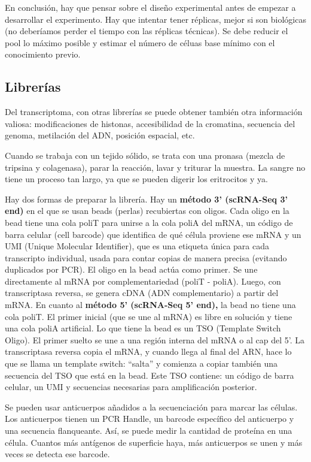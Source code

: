 En conclusión, hay que pensar sobre el diseño experimental antes de empezar a desarrollar el experimento. Hay que intentar tener réplicas, mejor si son biológicas (no deberíamos perder el tiempo con las réplicas técnicas). Se debe reducir el pool lo máximo posible y estimar el número de céluas base mínimo con el conocimiento previo.

\subsection{Librerías}
Del transcriptoma, con otras librerías se puede obtener también otra información valiosa: modificaciones de histonas, accesibilidad de la cromatina, secuencia del genoma, metilación del ADN, posición espacial, etc.

Cuando se trabaja con un tejido sólido, se trata con una pronasa (mezcla de tripsina y colagenasa), parar la reacción, lavar y triturar la muestra. La sangre no tiene un proceso tan largo, ya que se pueden digerir los eritrocitos y ya. 

Hay dos formas de preparar la librería. Hay un \textbf{método 3’ (scRNA-Seq 3’ end)} en el que se usan beads (perlas) recubiertas con oligos. Cada oligo en la bead tiene una cola poliT para unirse a la cola poliA del mRNA, un código de barra celular (cell barcode) que identifica de qué célula proviene ese mRNA y un UMI (Unique Molecular Identifier), que es una etiqueta única para cada transcripto individual, usada para contar copias de manera precisa (evitando duplicados por PCR). El oligo en la bead actúa como primer. Se une directamente al mRNA por complementariedad (poliT - poliA). Luego, con transcriptasa reversa, se genera cDNA (ADN complementario) a partir del mRNA.
En cuanto al \textbf{método 5’ (scRNA-Seq 5’ end),} la bead no tiene una cola poliT. El primer inicial (que se une al mRNA) es libre en solución y tiene una cola poliA artificial. Lo que tiene la bead es un TSO (Template Switch Oligo). El primer suelto se une a una región interna del mRNA o al cap del 5’. La transcriptasa reversa copia el mRNA, y cuando llega al final del ARN, hace lo que se llama un template switch: “salta” y comienza a copiar también una secuencia del TSO que está en la bead. Este TSO contiene: un código de barra celular, un UMI y secuencias necesarias para amplificación posterior.

Se pueden usar anticuerpos añadidos a la secuenciación para marcar las células. Los anticuerpos tienen un PCR Handle, un barcode específico del anticuerpo y una secuencia flanqueante. Así, se puede medir la cantidad de proteína en una célula. Cuantos más antígenos de superficie haya, más anticuerpos se unen y más veces se detecta ese barcode. 

